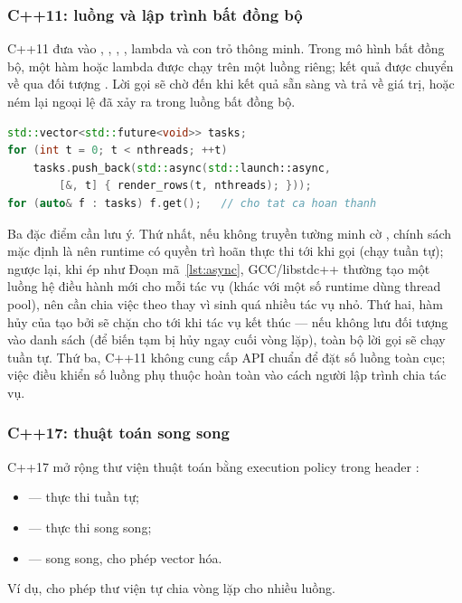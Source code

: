 \subsubsection{C++11: luồng và lập trình bất đồng bộ}

C++11 đưa vào , , ,
, lambda và con trỏ thông minh. Trong mô hình bất đồng bộ,
một hàm hoặc lambda được chạy trên một luồng riêng; kết quả được chuyển về qua
đối tượng . Lời gọi  sẽ chờ đến khi kết
quả sẵn sàng và trả về giá trị, hoặc ném lại ngoại lệ đã xảy ra trong luồng bất
đồng bộ.

\begin{lstlisting}[language=C++,caption={Mẫu bất đồng bộ với \code{std::async} và \code{std::future}.},label={lst:async}]
std::vector<std::future<void>> tasks;
for (int t = 0; t < nthreads; ++t)
    tasks.push_back(std::async(std::launch::async,
        [&, t] { render_rows(t, nthreads); }));
for (auto& f : tasks) f.get();   // cho tat ca hoan thanh
\end{lstlisting}

Ba đặc điểm cần lưu ý. Thứ nhất, nếu không truyền tường minh cờ
, chính sách mặc định là
 nên runtime có quyền trì hoãn thực thi
tới khi gọi  (chạy tuần tự); ngược lại, khi ép
 như Đoạn mã~\ref{lst:async}, GCC/libstdc++ thường tạo
một luồng hệ điều hành mới cho mỗi tác vụ (khác với một số runtime dùng thread
pool), nên cần chia việc theo  thay vì sinh quá nhiều tác vụ nhỏ.
Thứ hai, hàm hủy của  tạo bởi  sẽ chặn cho tới
khi tác vụ kết thúc — nếu không lưu đối tượng  vào danh sách (để
biến tạm bị hủy ngay cuối vòng lặp), toàn bộ lời gọi sẽ chạy tuần tự. Thứ ba,
C++11 không cung cấp API chuẩn để đặt số luồng toàn cục; việc điều khiển số luồng
phụ thuộc hoàn toàn vào cách người lập trình chia tác vụ.

\subsubsection{C++17: thuật toán song song}

C++17 mở rộng thư viện thuật toán bằng execution policy trong header
:
\begin{itemize}
  \item {} — thực thi tuần tự;
  \item {} — thực thi song song;
  \item {} — song song, cho phép vector hóa.
\end{itemize}
Ví dụ, 
cho phép thư viện tự chia vòng lặp cho nhiều luồng.

